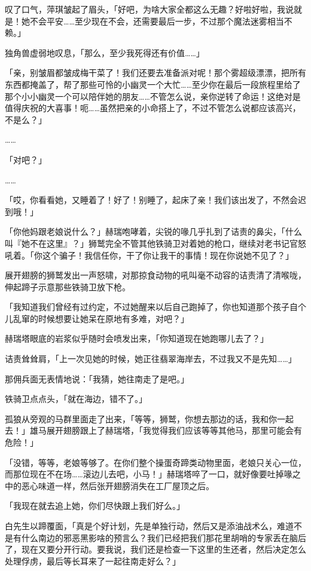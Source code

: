 叹了口气，萍琪皱起了眉头，「好吧，为啥大家全都这么无趣？好啦好啦，我说就是！她不会平安……至少现在不会，还需要最后一步，不过那个魔法迷雾相当不赖。」

独角兽虚弱地叹息，「那么，至少我死得还有价值……」

「亲，别皱眉都皱成梅干菜了！我们还要去准备派对呢！那个雾超级漂漂，把所有东西都掩盖了，帮了那些可怜的小幽灵一个大忙……至少你在最后一段旅程里给了那个小小幽灵一个可以陪伴她的朋友……不管怎么说，亲你逆转了命运！这绝对是值得庆祝的大喜事！呃……虽然把亲的小命搭上了，不过不管怎么说都应该高兴，不是么？」

……{}

「对吧？」

……{}

「哎，你看看她，又睡着了！好了！别睡了，起床了亲！我们该出发了，不然会迟到哦！」

\horizonline


「你他妈跟老娘说什么？」赫瑞咆哮着，尖锐的喙几乎扎到了诘责的鼻尖，「什么叫『她不在这里』？」狮鹫完全不管其他铁骑卫对着她的枪口，继续对老书记官怒吼着。「你这个骗子！我信任你，干了你让我干的事情！现在你说她不见了？」

展开翅膀的狮鹫发出一声怒啸，对那掠食动物的吼叫毫不动容的诘责清了清喉咙，伸起蹄子示意那些铁骑卫放下枪。

「我知道我们曾经有过约定，不过她醒来以后自己跑掉了，你也知道那个孩子自个儿乱窜的时候想要让她呆在原地有多难，对吧？」

赫瑞塔眼底的岩浆似乎随时会喷发出来，「你知道现在她跑哪儿去了？」

诘责耸耸肩，「上一次见她的时候，她正往翡翠海岸去，不过我又不是先知……」

那佣兵面无表情地说：「我猜，她往南走了是吧。」

铁骑卫点点头，「就在海边，错不了。」

孤狼从旁观的马群里面走了出来，「等等，狮鹫，你想去那边的话，我和你一起去！」雄马展开翅膀跟上了赫瑞塔，「我觉得我们应该等等其他马，那里可能会有危险！」

「没错，等等，老娘等够了。在你们整个操蛋奇蹄类动物里面，老娘只关心一位，而那位现在不在场……滚边儿去吧，小马！」赫瑞塔啐了一口，就好像要吐掉喙之中的恶心味道一样，然后张开翅膀消失在工厂屋顶之后。

「我现在就去追上她，你们尽快跟上我们好么。」

白先生以蹄覆面，「真是个好计划，先是单独行动，然后又是添油战术么，难道不是有什么南边的邪恶黑影啥的预言么？我们已经把我们那花里胡哨的专家丢在脑后了，现在又要分开行动。要我说，我们还是检查一下这里的生还者，然后决定怎么处理俘虏，最后等长耳来了一起往南走好么？」

